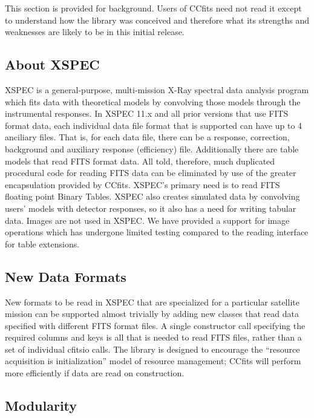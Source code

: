 This section is provided for background. Users of CCfits need not read it  except to understand how the library was conceived and therefore what its strengths and weaknesses are likely to be in this initial release.

\hypertarget{aboutXspec}{}\subsection{About XSPEC}\label{aboutXspec}


XSPEC is a general-purpose, multi-mission X-Ray spectral data analysis program which fits data with theoretical models by convolving those models  through the instrumental responses. In XSPEC 11.x and all prior versions that use FITS format data, each individual data file format that is supported can have up to 4 anciliary files. That is, for each data file, there can be a response, correction, background and auxiliary response (efficiency) file. Additionally there are table models that read FITS format data. All told, therefore, much duplicated procedural code for reading FITS data can be eliminated by use of the greater encapsulation provided by CCfits.  XSPEC's primary need is to read FITS floating point Binary Tables. XSPEC also creates simulated data by convolving users' models with  detector responses, so it also has a need for writing tabular data. Images are  not used in XSPEC. We have provided a support for image operations which has  undergone limited testing compared to the reading interface for table extensions.

\hypertarget{new}{}\subsection{New Data Formats}\label{new}


New formats to be read in XSPEC that are specialized for a particular satellite mission can be supported almost trivially by adding new classes that read data specified with different FITS format files. A single constructor call specifying the required columns and keys is all that is needed to read FITS files, rather than a set of individual cfitsio calls. The library is designed to encourage the ``resource acquisition is initialization'' model of resource management; CCfits will perform more efficiently if data are read on construction.

\hypertarget{module}{}\subsection{Modularity}\label{module}


